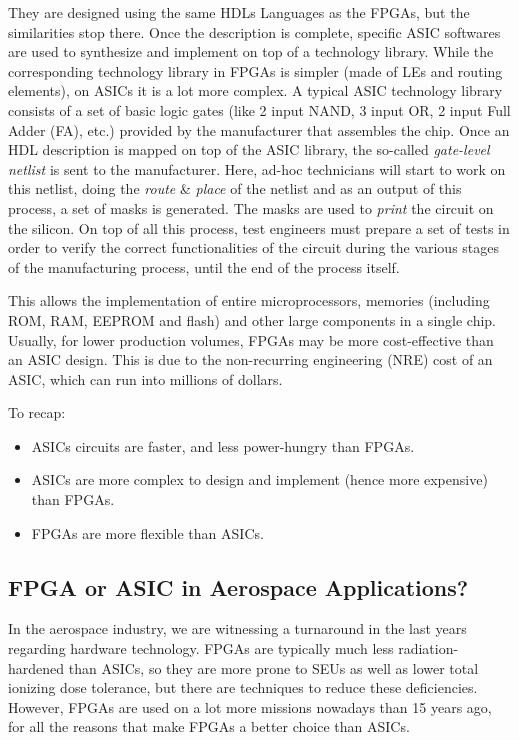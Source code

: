 They are designed using the same HDLs Languages as the FPGAs, but the similarities stop there. Once the description is complete, specific ASIC softwares are used to synthesize and implement on top of a technology library. While the corresponding technology library in FPGAs is simpler (made of LEs and routing elements), on ASICs it is a lot more complex. A typical ASIC technology library consists of a set of basic logic gates (like 2 input NAND, 3 input OR, 2 input Full Adder (FA), etc.) provided by the manufacturer that assembles the chip. Once an HDL description is mapped on top of the ASIC library, the so-called \textit{gate-level netlist} is sent to the manufacturer. Here, ad-hoc technicians will start to work on this netlist, doing the \textit{route} {\&} \textit{place} of the netlist and as an output of this process, a set of masks is generated. The masks are used to \textit{print} the circuit on the silicon. On top of all this process, test engineers must prepare a set of tests in order to verify the correct functionalities of the circuit during the various stages of the manufacturing process, until the end of the process itself. \bigskip

This allows the implementation of entire microprocessors, memories (including ROM, RAM, EEPROM and flash) and other large components in a single chip. Usually, for lower production volumes, FPGAs may be more cost-effective than an ASIC design. This is due to the non-recurring engineering (NRE) cost of an ASIC, which can run into millions of dollars. \bigskip

To recap:
\begin{itemize}
    \item ASICs circuits are faster, and less power-hungry than FPGAs.
    \item ASICs are more complex to design and implement (hence more expensive) than FPGAs.
    \item FPGAs are more flexible than ASICs.
\end{itemize}


\subsection{FPGA or ASIC in Aerospace Applications?}

In the aerospace industry, we are witnessing a turnaround in the last years regarding hardware technology. FPGAs are typically much less radiation-hardened than ASICs, so they are more prone to SEUs as well as lower total ionizing dose tolerance, but there are techniques to reduce these deficiencies. However, FPGAs are used on a lot more missions nowadays than 15 years ago, for all the reasons that make FPGAs a better choice than ASICs.\bigskip

